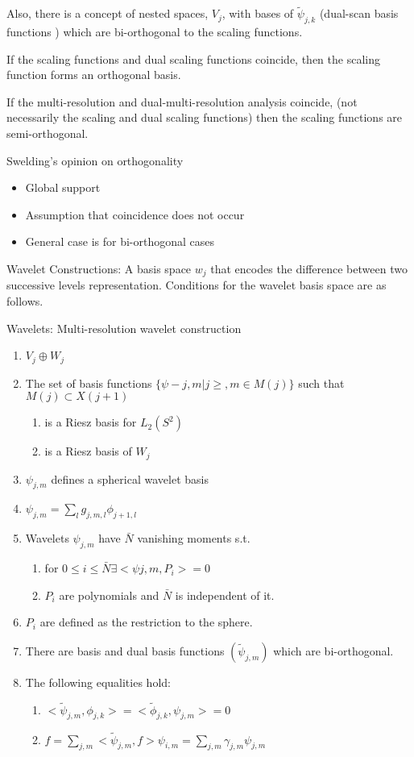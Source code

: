 \documentclass[11pt]{article}
\begin{document}
Also, there is a concept of nested spaces, $V_j$, with bases of $\tilde{\psi}_{j,k}$ (dual-scan basis functions ) which are bi-orthogonal to the scaling functions.  

If the scaling functions and dual scaling functions coincide, then the scaling function forms an orthogonal basis.  

If the multi-resolution and dual-multi-resolution analysis coincide, (not necessarily the scaling and dual scaling functions) then the scaling functions are semi-orthogonal.   

Swelding's opinion on orthogonality
\begin{itemize}
\item Global support 
\item Assumption that coincidence does not occur
\item General case is for bi-orthogonal cases 
\end{itemize}

Wavelet Constructions: A basis space $w_j$ that encodes the difference between two successive levels representation.  Conditions for the wavelet basis space are as follows.  

Wavelets: Multi-resolution wavelet construction 

\begin{enumerate}
\item $V_j \oplus W_j$
\item The set of basis functions $\{\psi-{j,m} | j\ge , m \in M(j)\}$ such that $M(j)\subset X(j+1)$
\begin{enumerate}
\item is a Riesz basis for $L_2(S^2)$
\item is a Riesz basis of $W_j$
\end{enumerate}

\item $\psi_{j,m}$ defines a spherical wavelet basis
\item $\psi_{j,m} = \sum_l g_{j,m,l} \phi_{j+1,l}$
\item Wavelets $\psi_{j,m}$ have $\bar{N}$ vanishing moments s.t. 
\begin{enumerate}
\item for $0\le i \le \bar{N} \exists <\psi{j,m}, P_i> = 0 $
\item $ P_i$ are polynomials and $\bar{N}$ is independent of it. 
\end{enumerate}
\item $ P_i$ are defined as the restriction to the sphere.  
\item There are basis and dual basis functions $( \tilde{\psi}_{j,m} )$ which are bi-orthogonal.  
\item The following equalities hold:  
\begin{enumerate}
\item $<\tilde{\psi}_{j,m}, \phi_{j,k}> = <\tilde{\phi}_{j,k}, \psi_{j,m}> = 0$
\item $f= \sum_{j,m} <\tilde{\psi}_{j,m} , f> \psi_{i,m} = \sum_{j,m} \gamma _{j,m} \psi _{j,m}$
\end{enumerate}

\end{enumerate}
\end{document}
